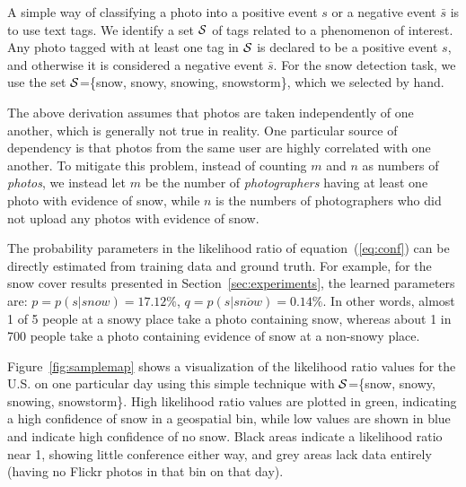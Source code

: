 A simple way of classifying a photo into a positive event $s$ or a
negative event $\bar{s}$ is to use text tags. We identify a
set ${\cal S}$ of tags related to a phenomenon of
interest. Any photo tagged with at least one tag in ${\cal S}$ is
declared to be a positive event $s$, and otherwise it is considered a
negative event $\bar{s}$. For the snow detection task, we use the set
${\cal S}$=\{snow, snowy, snowing, snowstorm\}, which we selected
by hand.


The above derivation assumes that photos are taken independently of
one another, which is generally not true in reality. One particular
source of dependency is that photos from the same user are highly
correlated with one another.  To mitigate this problem, instead of
counting $m$ and $n$ as numbers of \textit{photos}, we instead let $m$ be 
the number of \textit{photographers} having at least one photo with evidence of snow,
while $n$ is the numbers of photographers who did not upload any
photos with evidence of snow.

The probability parameters in the likelihood ratio of
equation~(\ref{eq:conf}) can be directly estimated from training data
and ground truth. For example, for the snow cover results
presented in Section~\ref{sec:experiments}, the learned parameters are: $p
= p(s|snow) = 17.12\%$, $q = p(s|\overline{snow}) = 0.14\%$.  In other
words, almost 1 of 5 people at a snowy place take a photo containing
snow, whereas about 1 in 700 people take a photo containing evidence
of snow at a non-snowy place.

Figure~\ref{fig:samplemap} shows a visualization of the likelihood
ratio values for the U.S. on one particular day using this simple
technique with ${\cal S}$=\{snow, snowy, snowing, snowstorm\}.  High
likelihood ratio values are plotted
in green, indicating a high confidence of snow in a geospatial bin,
while low values are shown in blue and indicate high confidence of 
no snow.  Black areas indicate a likelihood ratio 
near 1, showing little conference either way, and grey areas lack
data entirely (having no Flickr photos in that bin on that day).




